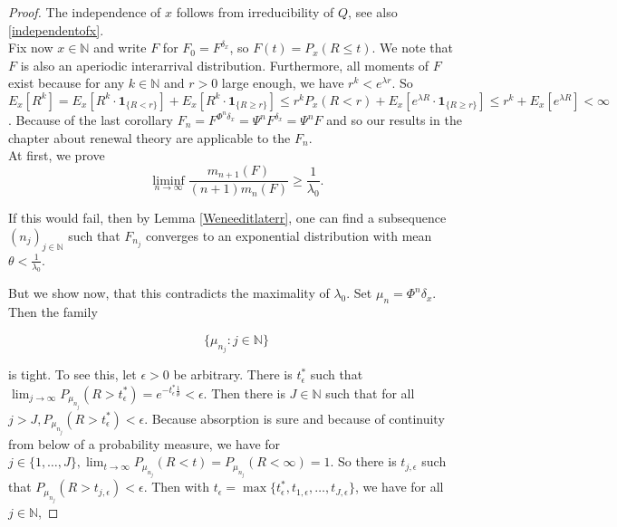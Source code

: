\documentclass[12pt,a4paper]{scrartcl}
\numberwithin{equation}{section}
\newcommand{\N}{\mathbb{N}} %
\begin{document}
\begin{proof}
The independence of $x$ follows from irreducibility of $ Q $, see also \eqref{independentofx}.\\[0.3ex]

Fix now $x \in \N$ and write $F$ for $ F_0 = F^{\delta_x}$, so $ F\left(t\right) = P_x\left(R \leq t\right)$. 
We note that $ F $ is also an aperiodic interarrival distribution. Furthermore, all moments of $F$ exist because for any $ k \in \N $ and $ r > 0 $ large enough, we have $r^k < e^{\lambda r}$. So $E_x\left[R^k\right] = E_x\left[R^k \cdot \textbf{1}_{\lbrace R < r\rbrace }\right] + E_x\left[R^k \cdot \textbf{1}_{\lbrace R \geq r\rbrace }\right] \leq r^k  P_x\left(R < r\right) + E_x\left[e^{\lambda R}\cdot \textbf{1}_{\lbrace R \geq r\rbrace }\right] \leq r^k + E_x\left[e^{\lambda R}\right] < \infty $.
Because of the last corollary $ F_n = F^{\Phi^n \delta_x} = \Psi^n F^{\delta_x} = \Psi^n F $ and so our results in the chapter about renewal theory are applicable to the $F_n$. \\[2ex]

At first, we prove
\begin{equation}
\liminf_{n \to \infty} \frac{m_{n+1}\left(F\right)}{\left(n+1\right) m_n\left(F\right)} \geq \frac{1}{\lambda_0}.
\label{eq:inbetweenresult}
\end{equation}

If this would fail, then by Lemma \ref{Weneeditlaterr}, one can find a subsequence $ \left(n_j\right)_{j \in \N} $ such that $ F_{n_j} $ converges to an exponential distribution with mean $ \theta < \frac{1}{\lambda_0} $.

But we show now, that this contradicts the maximality of $ \lambda_0 $. Set $ \mu_n = \Phi^n \delta_x $. Then the family

\begin{equation}
\lbrace  \mu_{n_j} : j \in \N \rbrace 
\end{equation}

is tight. To see this, let $ \epsilon > 0 $ be arbitrary. There is $t_{\epsilon}^{\ast}$ such that $ \lim_{j \to \infty} P_{\mu_{n_j}}\left(R > t_{\epsilon}^{\ast}\right) = e^{-t_{\epsilon}^{\ast} \frac{1}{\theta}} < \epsilon $. Then there is $ J \in \N $ such that for all $ j > J , P_{\mu_{n_j}}\left(R > t_{\epsilon}^{\ast}\right) < \epsilon $. Because absorption is sure and because of continuity from below of a probability measure, we have for $ j \in \lbrace 1,\ldots, J\rbrace  , \lim_{t \to \infty} P_{\mu_{n_j}}\left(R < t\right) = P_{\mu_{n_j}}\left(R < \infty\right) = 1 $. So there is $ t_{j,\epsilon} $ such that $ P_{\mu_{n_j}}\left(R > t_{j,\epsilon}\right) < \epsilon $. Then with $t_{\epsilon} = \max\lbrace t_{\epsilon}^{\ast}, t_{1,\epsilon}, \ldots , t_{J,\epsilon}\rbrace  $, we have for all $j \in \N$,


\end{proof}
\end{document}
